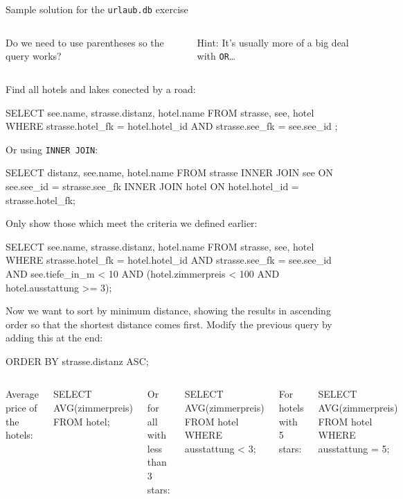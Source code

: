 \begin{frame}{Sample solution for the \texttt{urlaub.db} exercise}
\begin{columns}
Do we need to use parentheses so the query works?

Hint: It's usually more of a big deal with \texttt{OR}\dots
\end{columns}


\framebreak 

Find all hotels and lakes conected by a road: 

\begin{sqlcode}
SELECT see.name, strasse.distanz, hotel.name  
FROM strasse, see, hotel 
WHERE strasse.hotel_fk = hotel.hotel_id 
    AND strasse.see_fk = see.see_id ;
\end{sqlcode}

Or using \texttt{INNER JOIN}:
\begin{sqlcode}
SELECT distanz, see.name, hotel.name 
FROM strasse
INNER JOIN see ON see.see_id = strasse.see_fk
INNER JOIN hotel 
ON hotel.hotel_id = strasse.hotel_fk;
\end{sqlcode}

\framebreak 

Only show those which meet the criteria we defined earlier:
\begin{sqlcode}
SELECT see.name, strasse.distanz, hotel.name  
FROM strasse, see, hotel 
WHERE strasse.hotel_fk = hotel.hotel_id 
    AND strasse.see_fk = see.see_id 
    AND see.tiefe_in_m < 10
    AND (hotel.zimmerpreis < 100 AND hotel.ausstattung >= 3);
\end{sqlcode}

Now we want to sort by minimum distance, showing the results in ascending order so that the shortest distance comes first. Modify the previous query by adding this at the end:
\begin{sqlcode}
ORDER BY strasse.distanz ASC;
\end{sqlcode}

\framebreak 


\begin{columns}
\medskip

  Average price of the hotels:
\begin{sqlcode}
SELECT AVG(zimmerpreis) FROM hotel;
\end{sqlcode}
Or for all with less than 3 stars:
\begin{sqlcode}
SELECT AVG(zimmerpreis) FROM hotel
WHERE ausstattung < 3;
\end{sqlcode}

For hotels with 5 stars:
\begin{sqlcode}
SELECT AVG(zimmerpreis) 
FROM hotel
WHERE ausstattung = 5;
\end{sqlcode}
\end{columns}
\medskip


\end{frame}
